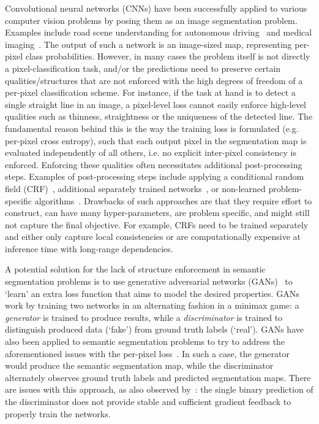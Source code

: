 \documentclass{article} \usepackage{nips13submit_e,times}
\begin{document}
Convolutional neural networks (CNNs) have been successfully applied to various computer vision problems by posing them as an image segmentation problem.
Examples include road scene understanding for autonomous driving~\cite{luc2016semantic,neven2018towards,pan2017spatial} and medical imaging~\cite{bentaieb2016topology,dai2017scan,huo2017splenomegaly,kohl2017adversarial,moeskops2017adversarial,oktay2017anatomically}.
The output of such a network is an image-sized map, representing per-pixel class probabilities.
However, in many cases the problem itself is not directly a pixel-classification task, and/or the predictions need to preserve certain qualities/structures that are not enforced with the high degrees of freedom of a per-pixel classification scheme. 
For instance, if the task at hand is to detect a single straight line in an image, a pixel-level loss cannot easily enforce high-level qualities such as thinness, straightness or the uniqueness of the detected line.
The fundamental reason behind this is the way the training loss is formulated (e.g. per-pixel cross entropy), such that each output pixel in the segmentation map is evaluated independently of all others, i.e. no explicit inter-pixel consistency is enforced.
Enforcing these qualities often necessitates additional post-processing steps.
Examples of post-processing steps include applying a conditional random field (CRF)~\cite{krahenbuhl2011efficient}, additional separately trained networks~\cite{neven2018towards}, or non-learned problem-specific algorithms~\cite{barhillel2014recent}.
Drawbacks of such approaches are that they require effort to construct, can have many hyper-parameters, are problem specific, and might still not capture the final objective.
For example, CRFs need to be trained separately and either only capture local consistencies or are computationally expensive at inference time with long-range dependencies.

A potential solution for the lack of structure enforcement in semantic segmentation problems is to use generative adversarial networks (GANs)~\cite{goodfellow2014generative} to `learn' an extra loss function that aims to model the desired properties.
GANs work by training two networks in an alternating fashion in a minimax game: a \textit{generator} is trained to produce results, while a \textit{discriminator} is trained to distinguish produced data (`fake') from ground truth labels (`real').
GANs have also been applied to semantic segmentation problems to try to address the aforementioned issues with the per-pixel loss~\cite{luc2016semantic}.
In such a case, the generator would produce the semantic segmentation map, while the discriminator alternately observes ground truth labels and predicted segmentation maps.
There are issues with this approach, as also observed by~\cite{xue2017segan}: the single binary prediction of the discriminator does not provide stable and sufficient gradient feedback to properly train the networks.
\end{document}
